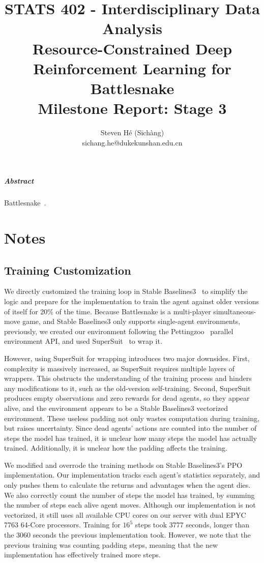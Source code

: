 \documentclass[a4paper]{article}
\title{STATS 402 - Interdisciplinary Data Analysis\\
    Resource-Constrained Deep Reinforcement Learning for Battlesnake\\
    Milestone Report: Stage 3
}
\author{Steven Hé (Sīchàng)\\
    sichang.he@dukekunshan.edu.cn
}
\begin{document}
\maketitle

\subparagraph{Abstract}

Battlesnake~\cite{battlesnake}.

\section{Notes}

\subsection{Training Customization}

We directly customized the training loop in Stable
Baselines3~\cite{raffin2024stable}
to simplify the logic and prepare for the implementation to train the agent
against older versions of itself for 20\% of the time.
Because Battlesnake is a multi-player simultaneous-move game,
and Stable Baselines3 only supports single-agent environments,
previously, we created our environment
following the Pettingzoo~\cite{terry2021pettingzoo} parallel environment API,
and used SuperSuit~\cite{SuperSuit} to wrap it.

However, using SuperSuit for wrapping introduces two major downsides. First,
complexity is massively increased,
as SuperSuit requires multiple layers of wrappers.
This obstructs the understanding of the training process and hinders any
modifications to it, such as the old-version self-training. Second,
SuperSuit produces empty observations and zero rewards for dead agents,
so they appear alive,
and the environment appears to be a Stable Baselines3 vectorized environment.
These useless padding not only wastes computation during training,
but raises uncertainty.
Since dead agents' actions are counted into the number of steps the model has
trained, it is unclear how many steps the model has actually trained.
Additionally, it is unclear how the padding affects the training.

We modified and overrode the training methods on Stable Baselines3's PPO
implementation. Our implementation tracks each agent's statistics separately,
and only pushes them to calculate the returns and advantages when the agent
dies. We also correctly count the number of steps the model has trained,
by summing the number of steps each alive agent moves.
Although our implementation is not vectorized,
it still uses all available CPU cores on our server with dual EPYC 7763 64-Core
processors. Training for $16^5$ steps took 3777 seconds,
longer than the 3060 seconds the previous implementation took. However,
we note that the previous training was counting padding steps,
meaning that the new implementation has effectively trained more steps.

\printbibliography
\end{document}
